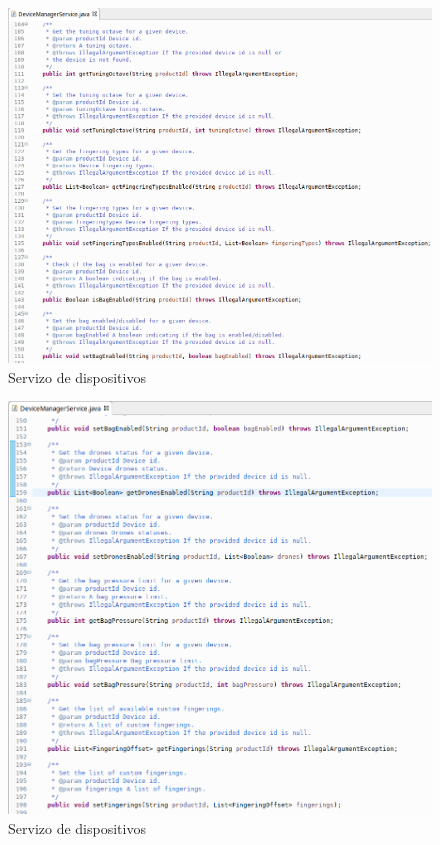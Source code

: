    \begin{figure}[htbp]
    \centering
    \includegraphics[scale=0.6, keepaspectratio=true]{./imagenes/servizo-dispositivos-3.png}
    \caption{Servizo de dispositivos}
    \label{figura:ServizoDispositivos3}
   \end{figure}
   
   \begin{figure}[htbp]
    \centering
    \includegraphics[scale=0.6, keepaspectratio=true]{./imagenes/servizo-dispositivos-4.png}
    \caption{Servizo de dispositivos}
    \label{figura:ServizoDispositivos4}
   \end{figure}
   
